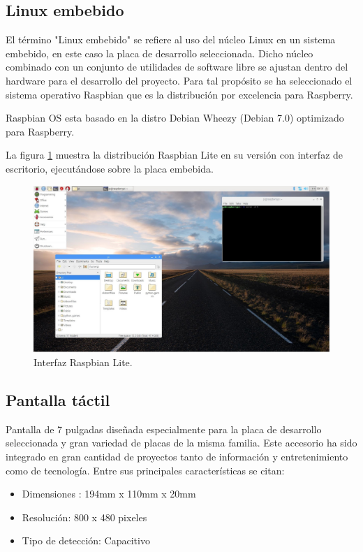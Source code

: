  \subsection{Linux embebido}
El término "Linux embebido" se refiere al uso del núcleo Linux en un sistema embebido, en este caso la placa de desarrollo seleccionada.
Dicho núcleo combinado con un conjunto de utilidades de software libre  se ajustan dentro del hardware para el desarrollo del proyecto.
Para tal propósito se ha seleccionado el sistema operativo Raspbian que es la distribución por excelencia para Raspberry.

Raspbian OS esta basado en la distro Debian Wheezy (Debian 7.0) optimizado para Raspberry.

La figura \ref{fig:raspbian} muestra la distribución Raspbian Lite en su versión con interfaz de escritorio, ejecutándose sobre la placa embebida.

\begin{figure}[H]
	\centering
	\includegraphics[scale=.35]{./Figures/raspbian.pdf}
	\caption{Interfaz Raspbian Lite.}
	\label{fig:raspbian}
\end{figure}

 \subsection{Pantalla táctil}
Pantalla de 7 pulgadas diseñada especialmente para la placa de desarrollo seleccionada y gran variedad de placas de la misma familia. 
Este accesorio ha sido integrado en gran cantidad de proyectos tanto de información y entretenimiento como de tecnología. 
Entre sus principales características se citan:

\begin{itemize}
\item Dimensiones : 194mm x 110mm x 20mm 
\item Resolución: 800 x 480 pixeles
\item Tipo de detección: Capacitivo
\end{itemize}

